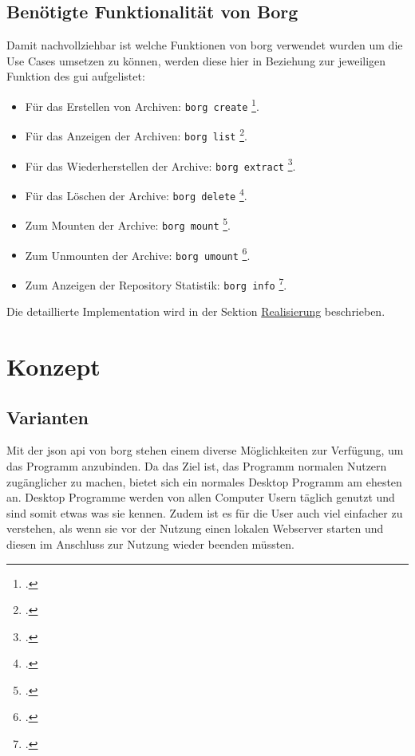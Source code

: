 \newpage
\subsection{Benötigte Funktionalität von Borg}
\label{sec:orgc8db247}

Damit nachvollziehbar ist welche Funktionen von \gls{borg} verwendet wurden um
die Use Cases umsetzen zu können, werden diese hier in Beziehung zur
jeweiligen Funktion des \gls{gui} aufgelistet:
\begin{itemize}
\item Für das Erstellen von Archiven: \texttt{borg create} \footcite{borgcreate}.
\item Für das Anzeigen der Archiven: \texttt{borg list} \footcite{borglist}.
\item Für das Wiederherstellen der Archive: \texttt{borg extract} \footcite{borgextract}.
\item Für das Löschen der Archive: \texttt{borg delete} \footcite{borgdelete}.
\item Zum Mounten der Archive: \texttt{borg mount} \footcite{borgmount}.
\item Zum Unmounten der Archive: \texttt{borg umount} \footcite{borgumount}.
\item Zum Anzeigen der Repository Statistik: \texttt{borg info} \footcite{borginfo}.
\end{itemize}

Die detaillierte Implementation wird in der Sektion \hyperref[sec:orgb833f22]{Realisierung} beschrieben.

\cleardoublepage
\section{Konzept}
\label{sec:org3462c4c}

\subsection{Varianten}
\label{sec:org44227c4}

Mit der \gls{json} \gls{api} von \gls{borg} stehen einem diverse Möglichkeiten zur
Verfügung, um das Programm anzubinden. Da das Ziel ist, das Programm normalen
Nutzern zugänglicher zu machen, bietet sich ein normales Desktop Programm am
ehesten an. Desktop Programme werden von allen Computer Usern täglich genutzt
und sind somit etwas was sie kennen. Zudem ist es für die User auch viel
einfacher zu verstehen, als wenn sie vor der Nutzung einen lokalen Webserver
starten und diesen im Anschluss zur Nutzung wieder beenden müssten.

